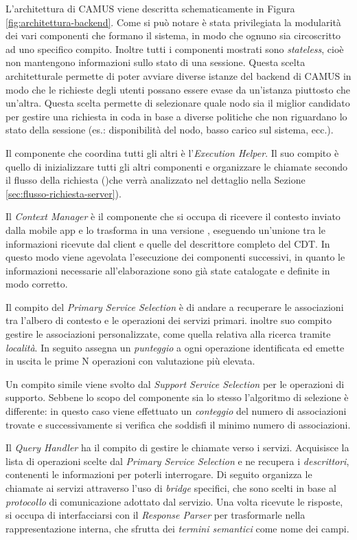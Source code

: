 L'architettura di CAMUS viene descritta schematicamente in Figura \ref{fig:architettura-backend}. Come si può notare è stata privilegiata la modularità dei vari componenti che formano il sistema, in modo che ognuno sia circoscritto ad uno specifico compito. Inoltre tutti i componenti mostrati sono \emph{stateless}, cioè non mantengono informazioni sullo stato di una sessione. Questa scelta architetturale permette di poter avviare diverse istanze del backend di CAMUS in modo che le richieste degli utenti possano essere evase da un'istanza piuttosto che un'altra. Questa scelta permette di selezionare quale nodo sia il miglior candidato per gestire una richiesta in coda in base a diverse politiche che non riguardano lo stato della sessione (es.: disponibilità del nodo, basso carico sul sistema, ecc.).

Il componente che coordina tutti gli altri è l'\emph{Execution Helper}. Il suo compito è quello di inizializzare tutti gli altri componenti e organizzare le chiamate secondo il flusso della richiesta ()che verrà analizzato nel dettaglio nella Sezione \ref{sec:flusso-richiesta-server}).

Il \emph{Context Manager} è il componente che si occupa di ricevere il contesto inviato dalla mobile app e lo trasforma in una versione , eseguendo un'unione tra le informazioni ricevute dal client e quelle del descrittore completo del CDT. In questo modo viene agevolata l'esecuzione dei componenti successivi, in quanto le informazioni necessarie all'elaborazione sono già state catalogate e definite in modo corretto.

Il compito del \emph{Primary Service Selection} è di andare a recuperare le associazioni tra l'albero di contesto e le operazioni dei servizi primari. \upe inoltre suo compito gestire le associazioni personalizzate, come quella relativa alla ricerca tramite \emph{località}. In seguito assegna un \emph{punteggio} a ogni operazione identificata ed emette in uscita le prime N operazioni con valutazione più elevata.

Un compito simile viene svolto dal \emph{Support Service Selection} per le operazioni di supporto. Sebbene lo scopo del componente sia lo stesso l'algoritmo di selezione è differente: in questo caso viene effettuato un \emph{conteggio} del numero di associazioni trovate e successivamente si verifica che soddisfi il minimo numero di associazioni.

Il \emph{Query Handler} ha il compito di gestire le chiamate verso i servizi. Acquisisce la lista di operazioni scelte dal \emph{Primary Service Selection} e ne recupera i \emph{descrittori}, contenenti le informazioni per poterli interrogare. Di seguito organizza le chiamate ai servizi attraverso l'uso di \emph{bridge} specifici, che sono scelti in base al \emph{protocollo} di comunicazione adottato dal servizio. Una volta ricevute le risposte, si occupa di interfacciarsi con il \emph{Response Parser} per trasformarle nella rappresentazione interna, che sfrutta dei \emph{termini semantici} come nome dei campi.


